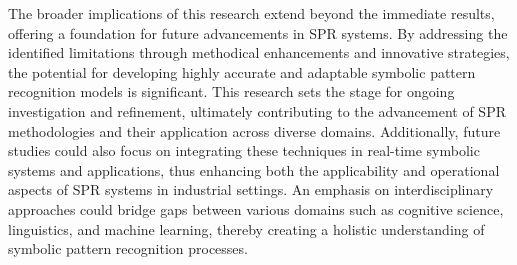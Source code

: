 \documentclass{article}
\begin{document}
The broader implications of this research extend beyond the immediate results, offering a foundation for future advancements in SPR systems. By addressing the identified limitations through methodical enhancements and innovative strategies, the potential for developing highly accurate and adaptable symbolic pattern recognition models is significant. This research sets the stage for ongoing investigation and refinement, ultimately contributing to the advancement of SPR methodologies and their application across diverse domains. Additionally, future studies could also focus on integrating these techniques in real-time symbolic systems and applications, thus enhancing both the applicability and operational aspects of SPR systems in industrial settings. An emphasis on interdisciplinary approaches could bridge gaps between various domains such as cognitive science, linguistics, and machine learning, thereby creating a holistic understanding of symbolic pattern recognition processes.



\end{document}
